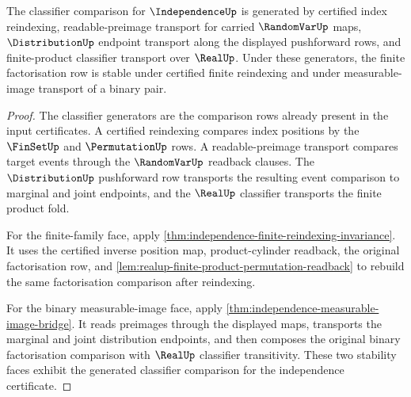 \begin{theorem}
\label{thm:independence-classifier-stability-obligation}
The classifier comparison for $\IndependenceUp$ is generated by certified index reindexing, readable-preimage transport for carried $\RandomVarUp$ maps, $\DistributionUp$ endpoint transport along the displayed pushforward rows, and finite-product classifier transport over $\RealUp$. Under these generators, the finite factorisation row is stable under certified finite reindexing and under measurable-image transport of a binary pair.
\end{theorem}
\begin{proof}
The classifier generators are the comparison rows already present in the input certificates. A certified reindexing compares index positions by the $\FinSetUp$ and $\PermutationUp$ rows. A readable-preimage transport compares target events through the $\RandomVarUp$ readback clauses. The $\DistributionUp$ pushforward row transports the resulting event comparison to marginal and joint endpoints, and the $\RealUp$ classifier transports the finite product fold.

For the finite-family face, apply \autoref{thm:independence-finite-reindexing-invariance}. It uses the certified inverse position map, product-cylinder readback, the original factorisation row, and \autoref{lem:realup-finite-product-permutation-readback} to rebuild the same factorisation comparison after reindexing.

For the binary measurable-image face, apply \autoref{thm:independence-measurable-image-bridge}. It reads preimages through the displayed maps, transports the marginal and joint distribution endpoints, and then composes the original binary factorisation comparison with $\RealUp$ classifier transitivity. These two stability faces exhibit the generated classifier comparison for the independence certificate.
\end{proof}

